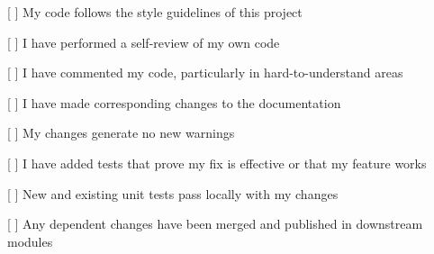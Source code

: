 \begin{DoxyItemize}
\item \mbox{[} \mbox{]} My code follows the style guidelines of this project
\item \mbox{[} \mbox{]} I have performed a self-\/review of my own code
\item \mbox{[} \mbox{]} I have commented my code, particularly in hard-\/to-\/understand areas
\item \mbox{[} \mbox{]} I have made corresponding changes to the documentation
\item \mbox{[} \mbox{]} My changes generate no new warnings
\item \mbox{[} \mbox{]} I have added tests that prove my fix is effective or that my feature works
\item \mbox{[} \mbox{]} New and existing unit tests pass locally with my changes
\item \mbox{[} \mbox{]} Any dependent changes have been merged and published in downstream modules 
\end{DoxyItemize}